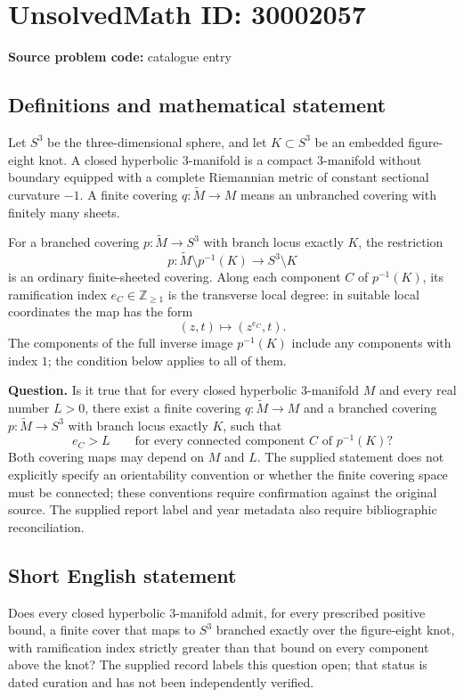 \documentclass[11pt]{article}
\newcommand{\Z}{\mathbb{Z}}
\begin{document}
\section*{UnsolvedMath ID: 30002057}
\textbf{Source problem code:} catalogue entry
\subsection{Definitions and mathematical statement}
Let \(S^3\) be the three-dimensional sphere, and let \(K\subset S^3\) be an embedded figure-eight knot. A closed hyperbolic \(3\)-manifold is a compact \(3\)-manifold without boundary equipped with a complete Riemannian metric of constant sectional curvature \(-1\). A finite covering \(q:\widetilde M\to M\) means an unbranched covering with finitely many sheets.

For a branched covering \(p:\widetilde M\to S^3\) with branch locus exactly \(K\), the restriction
\[
p:\widetilde M\setminus p^{-1}(K)\longrightarrow S^3\setminus K
\]
is an ordinary finite-sheeted covering. Along each component \(C\) of \(p^{-1}(K)\), its ramification index \(e_C\in\Z_{\geq 1}\) is the transverse local degree: in suitable local coordinates the map has the form
\[
(z,t)\longmapsto (z^{e_C},t).
\]
The components of the full inverse image \(p^{-1}(K)\) include any components with index \(1\); the condition below applies to all of them.

\textbf{Question.} Is it true that for every closed hyperbolic \(3\)-manifold \(M\) and every real number \(L>0\), there exist a finite covering \(q:\widetilde M\to M\) and a branched covering \(p:\widetilde M\to S^3\) with branch locus exactly \(K\), such that
\[
e_C>L\qquad\text{for every connected component }C\text{ of }p^{-1}(K)?
\]
Both covering maps may depend on \(M\) and \(L\). The supplied statement does not explicitly specify an orientability convention or whether the finite covering space must be connected; these conventions require confirmation against the original source. The supplied report label and year metadata also require bibliographic reconciliation.
\subsection{Short English statement}
Does every closed hyperbolic \(3\)-manifold admit, for every prescribed positive bound, a finite cover that maps to \(S^3\) branched exactly over the figure-eight knot, with ramification index strictly greater than that bound on every component above the knot? The supplied record labels this question open; that status is dated curation and has not been independently verified.
\end{document}
